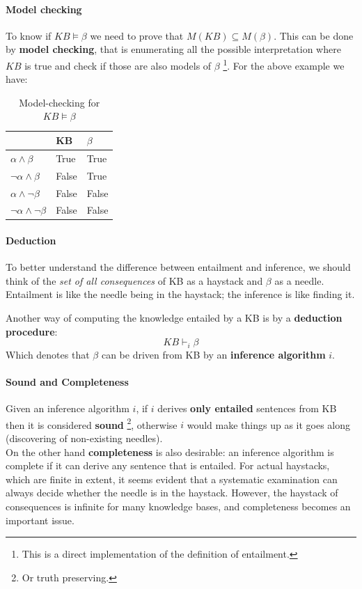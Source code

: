 \documentclass[10pt,a4paper]{article}
\begin{document}
\paragraph{Model checking}
\label{sec:model_checking}
To know if $KB \models \beta$ we need to prove that $M(KB) \subseteq M(\beta)$. This can be done by \textbf{model checking}, that is enumerating all the possible interpretation where $KB$ is true and check if those are also models of $\beta$ \footnote{This is a direct implementation of the definition of entailment.}. For the above example we have:

\begin{table}[H]
\centering
    \begin{tabular}{|l|l|l|}
        \hline
        ~                          & KB    & $\beta$ \\ \hline
        $\alpha \wedge \beta   $         & \cellcolor{blue!25} True  & \cellcolor{blue!25} True  \\ 
        $\neg \alpha \wedge \beta  $   & False & \cellcolor{blue!25} True  \\ 
       $\alpha \wedge \neg \beta  $     & False & False \\ 
        $\neg \alpha \wedge \neg \beta$  & False & False \\
        \hline
    \end{tabular}
    \caption{Model-checking for $KB\models\beta$}
\end{table}

\paragraph{Deduction} 
To better understand the difference between entailment and inference, we should think of the \textit{set of all consequences} of KB as a haystack and $\beta$ as a needle. Entailment is like the needle being in the haystack; the inference is like finding it.

Another way of computing the knowledge entailed by a KB is by a \textbf{deduction procedure}:
\[KB \vdash_i \beta\]
Which denotes that $\beta$ can be driven from KB by an \textbf{inference algorithm} $i$. 

\paragraph{Sound and Completeness} Given an inference algorithm $i$, if $i$ derives \textbf{only entailed} sentences from KB then it is considered \textbf{sound} \footnote{Or truth preserving.}, otherwise $i$ would make things up as it goes along (discovering of non-existing needles).\\
On the other hand \textbf{completeness} is also desirable: an inference algorithm is complete if it can derive any sentence that is entailed. For actual haystacks, which are finite in extent, it seems evident that a systematic examination can always decide whether the needle is in the haystack. However, the haystack of consequences is infinite for many knowledge bases, and completeness becomes an important issue.
\end{document}
